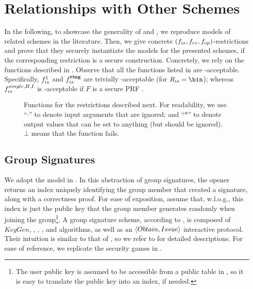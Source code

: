 \section{Relationships with Other Schemes}
\label{sec:relationships}


In the following, to showcase the generality of \UAS and \CUASGen, we reproduce
models of related schemes in the literature.
Then, we give concrete $(f_{is},f_{ev},f_{op})$-\CUASGen restrictions and prove
that they securely instantiate the models for the presented schemes, if the
corresponding \CUASGen restriction is a secure \UAS construction. Concretely,
we rely on the functions described in . Observe
that all the \fissue functions listed in  are
\UAS-acceptable. Specifically, $f_{is}^1$ and $f_{is}^{\mathbf{ring}}$ are trivially
\UAS-acceptable (for $\rngfissue = \bin$); whereas $f_{is}^{single,H,I}$ is
\UAS-acceptable if $F$ is a secure PRF \cite{kl14}.

\begin{figure}[ht!]
  \centering
  \scalebox{0.85}{
    
  }
  \caption{Functions for the \CUASGen restrictions described next.
    For readability, we use ``$\cdot$'' to denote input arguments that are
    ignored; and ``$\ast$'' to denote output values that can be set to anything
    (but should be ignored). $\bot$ means that the function fails.}
  \label{fig:func-restrictions}
\end{figure}

\subsection{Group Signatures}
\label{ssec:related-models-gs}

We adopt the model in \cite{bsz05}. In this abstraction of group signatures, the
opener returns an index uniquely identifying the group member that created a
signature, along with a correctness proof. For ease of exposition, assume that,
w.l.o.g., this index is just the public key that the group member generates
randomly when joining the group\footnote{The user public key is assumed to be
  accessible from a public table in \cite{bsz05}, so it is easy to translate the
  public key into an index, if needed.}. A group signature scheme, according to
\cite{bsz05}, is composed of $KeyGen$, \UKeyGen, \Sign, \Verify, \Open and
\Judge algorithms, as well as an $\langle Obtain,Issue\rangle$ interactive
protocol. Their intuition is similar to that of \UAS, so we refer to
\cite{bsz05} for detailed descriptions. For ease of reference, we replicate the
security games in .

